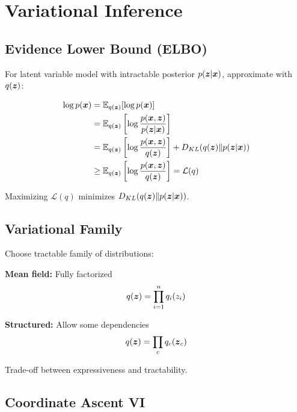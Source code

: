 
\section{Variational Inference}
\label{sec:variational-inference}

\subsection{Evidence Lower Bound (ELBO)}

For latent variable model with intractable posterior $p(\boldsymbol{z}|\boldsymbol{x})$, approximate with $q(\boldsymbol{z})$:

\begin{align}
\log p(\boldsymbol{x}) &= \mathbb{E}_{q(\boldsymbol{z})}[\log p(\boldsymbol{x})] \\
&= \mathbb{E}_{q(\boldsymbol{z})}\left[\log \frac{p(\boldsymbol{x}, \boldsymbol{z})}{p(\boldsymbol{z}|\boldsymbol{x})}\right] \\
&= \mathbb{E}_{q(\boldsymbol{z})}\left[\log \frac{p(\boldsymbol{x}, \boldsymbol{z})}{q(\boldsymbol{z})}\right] + D_{KL}(q(\boldsymbol{z}) \| p(\boldsymbol{z}|\boldsymbol{x})) \\
&\geq \mathbb{E}_{q(\boldsymbol{z})}\left[\log \frac{p(\boldsymbol{x}, \boldsymbol{z})}{q(\boldsymbol{z})}\right] = \mathcal{L}(q)
\end{align}

Maximizing $\mathcal{L}(q)$ minimizes $D_{KL}(q(\boldsymbol{z}) \| p(\boldsymbol{z}|\boldsymbol{x}))$.

\subsection{Variational Family}

Choose tractable family of distributions:

\textbf{Mean field:} Fully factorized
\begin{equation}
q(\boldsymbol{z}) = \prod_{i=1}^{n} q_i(z_i)
\end{equation}

\textbf{Structured:} Allow some dependencies
\begin{equation}
q(\boldsymbol{z}) = \prod_{c} q_c(\boldsymbol{z}_c)
\end{equation}

Trade-off between expressiveness and tractability.

\subsection{Coordinate Ascent VI}

